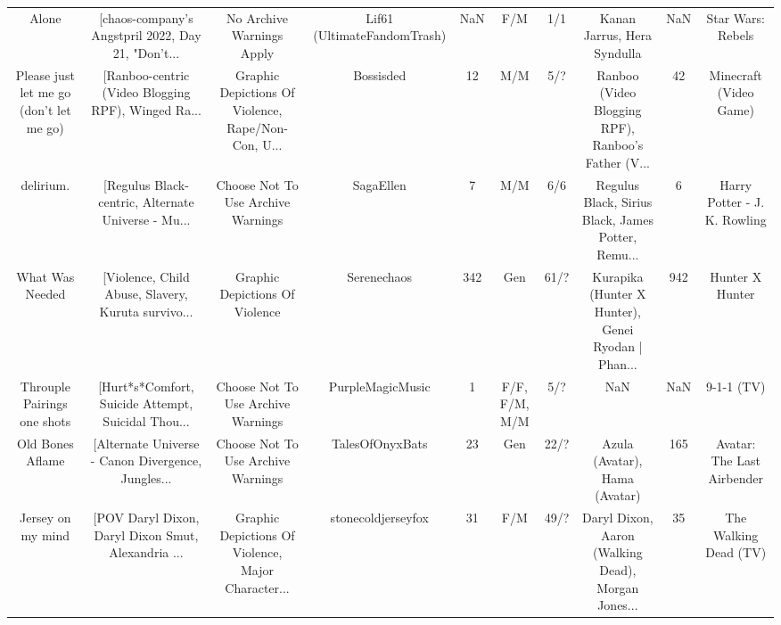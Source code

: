 \begin{table}[h!]
{\begin{tabular}{|c|c|c|c|c|c|c|c|c|c|}
                                             Alone & [chaos-company's Angstpril 2022, Day 21, "Don't... &                          No Archive Warnings Apply &        Lif61 (UltimateFandomTrash) &       NaN &                              F/M &      1/1 &                        Kanan Jarrus, Hera Syndulla &      NaN &                                  Star Wars: Rebels \\
           Please just let me go (don't let me go) & [Ranboo-centric (Video Blogging RPF), Winged Ra... & Graphic Depictions Of Violence, Rape/Non-Con, U... &                          Bossisded &        12 &                              M/M &      5/? & Ranboo (Video Blogging RPF), Ranboo's Father (V... &       42 &                             Minecraft (Video Game) \\
                                         delirium. & [Regulus Black-centric, Alternate Universe - Mu... &                 Choose Not To Use Archive Warnings &                          SagaEllen &         7 &                              M/M &      6/6 & Regulus Black, Sirius Black, James Potter, Remu... &        6 &                       Harry Potter - J. K. Rowling \\
                                   What Was Needed & [Violence, Child Abuse, Slavery, Kuruta survivo... &                     Graphic Depictions Of Violence &                        Serenechaos &       342 &                              Gen &     61/? & Kurapika (Hunter X Hunter), Genei Ryodan | Phan... &      942 &                                    Hunter X Hunter \\
                       Throuple Pairings one shots & [Hurt*s*Comfort, Suicide Attempt, Suicidal Thou... &                 Choose Not To Use Archive Warnings &                   PurpleMagicMusic &         1 &                    F/F, F/M, M/M &      5/? &                                                NaN &      NaN &                                         9-1-1 (TV) \\
                                  Old Bones Aflame & [Alternate Universe - Canon Divergence, Jungles... &                 Choose Not To Use Archive Warnings &                    TalesOfOnyxBats &        23 &                              Gen &     22/? &                      Azula (Avatar), Hama (Avatar) &      165 &                         Avatar: The Last Airbender \\
                                 Jersey on my mind & [POV Daryl Dixon, Daryl Dixon Smut, Alexandria ... & Graphic Depictions Of Violence, Major Character... &                 stonecoldjerseyfox &        31 &                              F/M &     49/? & Daryl Dixon, Aaron (Walking Dead), Morgan Jones... &       35 &                              The Walking Dead (TV) \\

\end{tabular}}
\end{table}
